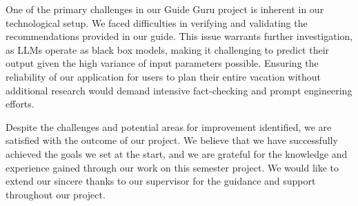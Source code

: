 \documentclass[english,notitlepage,smartquotes]{hgbreport}
\begin{document}
One of the primary challenges in our Guide Guru project is inherent in our technological setup. We faced difficulties in verifying and validating the recommendations provided in our guide. This issue warrants further investigation, as LLMs operate as black box models, making it challenging to predict their output given the high variance of input parameters possible. Ensuring the reliability of our application for users to plan their entire vacation without additional research would demand intensive fact-checking and prompt engineering efforts.

Despite the challenges and potential areas for improvement identified, we are satisfied with the outcome of our project. We believe that we have successfully achieved the goals we set at the start, and we are grateful for the knowledge and experience gained through our work on this semester project. We would like to extend our sincere thanks to our supervisor for the guidance and support throughout our project.


\appendix                                                   %



\MakeBibliography[nosplit]

\end{document}
